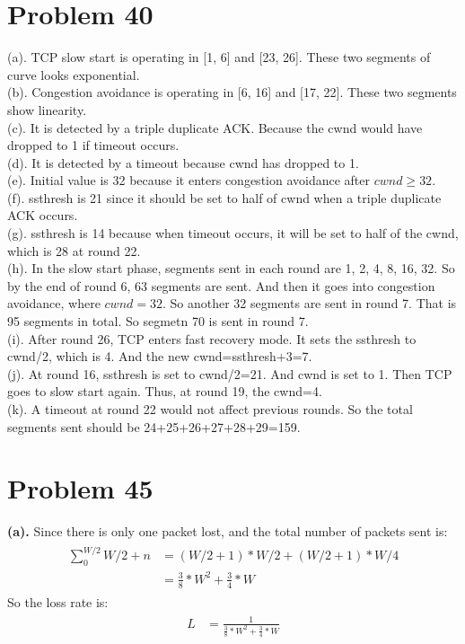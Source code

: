 \documentclass[titlepage, paper=a4, fontsize=11pt]{scrartcl} %
\numberwithin{equation}{section} %
\numberwithin{table}{section} %
\begin{document}
\section*{Problem 40}
(a).
TCP slow start is operating in [1, 6] and [23, 26]. These two segments of curve looks exponential. \\
(b).
Congestion avoidance is operating in [6, 16] and [17, 22]. These two segments show linearity. \\
(c).
It is detected by a triple duplicate ACK. Because the cwnd would have dropped to 1 if timeout occurs. \\
(d).
It is detected by a timeout because cwnd has dropped to 1. \\
(e).
Initial value is 32 because it enters congestion avoidance after $cwnd \geq 32$. \\
(f).
ssthresh is 21 since it should be set to half of cwnd when a triple duplicate ACK occurs. \\
(g).
ssthresh is 14 because when timeout occurs, it will be set to half of the cwnd, which is 28 at round 22. \\
(h).
In the slow start phase, segments sent in each round are 1, 2, 4, 8, 16, 32. So by the end of round 6, 63 segments are sent. And then it goes into congestion avoidance, where $cwnd=32$. So another 32 segments are sent in round 7. That is 95 segments in total. So segmetn 70 is sent in round 7. \\
(i).
After round 26, TCP enters fast recovery mode. It sets the ssthresh to cwnd/2, which is 4. And the new cwnd=ssthresh+3=7. \\
(j).
At round 16, ssthresh is set to cwnd/2=21. And cwnd is set to 1. Then TCP goes to slow start again. Thus, at round 19, the cwnd=4. \\
(k).
A timeout at round 22 would not affect previous rounds. So the total segments sent should be 24+25+26+27+28+29=159. \\



\section*{Problem 45}
\textbf{(a).}
Since there is only one packet lost, and the total number of packets sent is:
\begin{align*} 
\begin{split}
\sum_{0}^{W/2} W/2 + n &= (W/2+1)*W/2+(W/2+1)*W/4 \\
&= \frac{3}{8}*W^2+\frac{3}{4}*W
\end{split}					
\end{align*}
So the loss rate is:
\begin{align*} 
\begin{split}
L &= \frac{1}{\frac{3}{8}*W^2+\frac{3}{4}*W}
\end{split}					
\end{align*}
\end{document}
